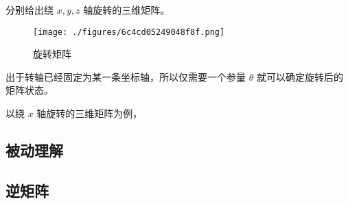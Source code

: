 \begin{example}{分别给出绕 $x,y,z$ 轴旋转的三维矩阵。}

\begin{figure}[ht]
\centering
\texttt{[image: ./figures/6c4cd05249048f8f.png]}
\caption{旋转矩阵} \label{fig_Rot3D_1}
\end{figure}

出于转轴已经固定为某一条坐标轴，所以仅需要一个参量 $\theta$ 就可以确定旋转后的矩阵状态。

以绕 $x$ 轴旋转的三维矩阵为例，

\end{example}


\subsection{被动理解}


\subsection{逆矩阵}

